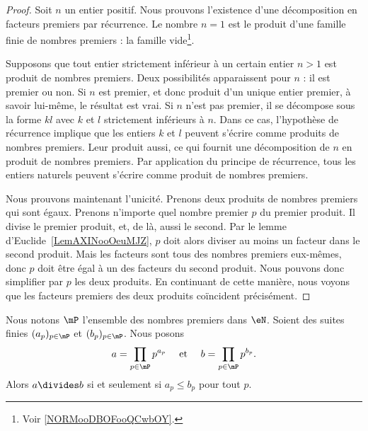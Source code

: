 \begin{proof}
    Soit \( n\) un entier positif. Nous prouvons l'existence d'une décomposition en facteurs premiers par récurrence. Le nombre \( n=1\) est le produit d'une famille finie de nombres premiers : la famille vide\footnote{Voir \ref{NORMooDBOFooQCwbOY}.}.

	Supposons que tout entier strictement inférieur à un certain entier \( n>1\) est produit de nombres premiers. Deux possibilités apparaissent pour \( n\) : il est premier ou non. Si \( n\) est premier, et donc produit d'un unique entier premier, à savoir lui-même, le résultat est vrai. Si \( n\) n'est pas premier, il se décompose sous la forme \( kl\) avec \( k\) et \( l\) strictement inférieurs à \( n\). Dans ce cas, l'hypothèse de récurrence implique que les entiers \( k\) et \( l\) peuvent s'écrire comme produits de nombres premiers. Leur produit aussi, ce qui fournit une décomposition de \( n\) en produit de nombres premiers. Par application du principe de récurrence, tous les entiers naturels peuvent s'écrire comme produit de nombres premiers.

	Nous prouvons maintenant l'unicité. Prenons deux produits de nombres premiers qui sont égaux. Prenons n'importe quel nombre premier \( p\) du premier produit. Il divise le premier produit, et, de là, aussi le second. Par le lemme d'Euclide~\ref{LemAXINooOeuMJZ}, \( p\) doit alors diviser au moins un facteur dans le second produit. Mais les facteurs sont tous des nombres premiers eux-mêmes, donc \( p\) doit être égal à un des facteurs du second produit. Nous pouvons donc simplifier par \( p\) les deux produits. En continuant de cette manière, nous voyons que les facteurs premiers des deux produits coïncident précisément.
\end{proof}

\begin{lemma}        \label{LEMooDTQQooYoJABt}
	Nous notons \( \mP\) l'ensemble des nombres premiers dans \( \eN\). Soient des suites finies \( (a_p)_{p\in \mP}\) et \( (b_p)_{p\in \mP}\). Nous posons
	\begin{equation}
		\begin{aligned}[]
			a & =\prod_{ p\in\mP}p^{a_p} & \text{ et } &  & b=\prod_{ p\in \mP}p^{b_p}.
		\end{aligned}
	\end{equation}
	Alors \( a\divides b\) si et seulement si \( a_p\leq b_p\) pour tout \( p\).
\end{lemma}

